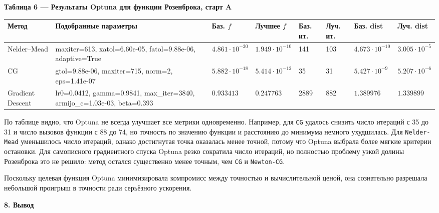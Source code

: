 \documentclass[12pt]{article}
\begin{document}
\begin{large}
\begin{center}
\textbf{Таблица 6 --- Результаты Optuna для функции Розенброка, старт A}
\end{center}
\scriptsize
\begin{longtable}{|p{2.4cm}|p{5.7cm}|p{1.25cm}|p{1.25cm}|p{1.0cm}|p{1.0cm}|p{1.25cm}|p{1.25cm}|}
\hline
\textbf{Метод} & \textbf{Подобранные параметры} & \textbf{Баз. $f$} & \textbf{Лучшее $f$} & \textbf{Баз. ит.} & \textbf{Луч. ит.} & \textbf{Баз. dist} & \textbf{Луч. dist} \\ 
\hline
Nelder--Mead & maxiter=613, xatol=6.60e-05, fatol=9.88e-06, adaptive=True & $4.861\cdot 10^{-20}$ & $1.949\cdot 10^{-10}$ & 141 & 103 & $4.673\cdot 10^{-10}$ & $3.005\cdot 10^{-5}$ \\ 
\hline
CG & gtol=9.88e-06, maxiter=715, norm=2, eps=1.41e-07 & $5.882\cdot 10^{-18}$ & $5.414\cdot 10^{-12}$ & 35 & 31 & $5.427\cdot 10^{-9}$ & $5.207\cdot 10^{-6}$ \\ 
\hline
Gradient Descent & lr0=0.0412, gamma=0.9841, max\_iter=3840, armijo\_c=1.03e-03, beta=0.393 & $0.933413$ & $0.247763$ & 2889 & 882 & $1.389976$ & $1.339899$ \\ 
\hline
\end{longtable}
\normalsize

\par По таблице видно, что Optuna не всегда улучшает все метрики одновременно. Например, для \texttt{CG} удалось снизить число итераций с 35 до 31 и число вызовов функции с 88 до 74, но точность по значению функции и расстоянию до минимума немного ухудшилась. Для \texttt{Nelder-Mead} уменьшилось число итераций, однако достигнутая точка оказалась менее точной, потому что Optuna выбрала более мягкие критерии остановки. Для самописного градиентного спуска Optuna резко сократила число итераций, но полностью проблему узкой долины Розенброка это не решило: метод остался существенно менее точным, чем \texttt{CG} и \texttt{Newton-CG}.

\par Поскольку целевая функция Optuna минимизировала компромисс между точностью и вычислительной ценой, она сознательно разрешала небольшой проигрыш в точности ради серьёзного ускорения.

\par \textbf{8. Вывод}


\end{large}
\end{document}
